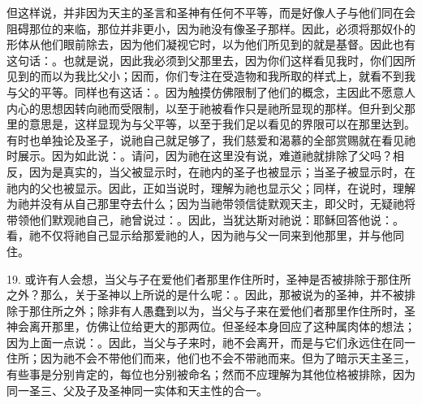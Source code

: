 但这样说，并非因为天主的圣言和圣神有任何不平等，而是好像人子与他们同在会阻碍那位的来临，那位并非更小，因为祂没有像圣子那样。因此，必须将那奴仆的形体从他们眼前除去，因为他们凝视它时，以为他们所见到的就是基督。因此也有这句话：。也就是说，因此我必须到父那里去，因为你们这样看见我时，你们因所见到的而以为我比父小；因而，你们专注在受造物和我所取的样式上，就看不到我与父的平等。同样也有这话：。因为触摸仿佛限制了他们的概念，主因此不愿意人内心的思想因转向祂而受限制，以至于祂被看作只是祂所显现的那样。但升到父那里的意思是，这样显现为与父平等，以至于我们足以看见的界限可以在那里达到。有时也单独论及圣子，说祂自己就足够了，我们慈爱和渴慕的全部赏赐就在看见祂时展示。因为如此说：。请问，因为祂在这里没有说，难道祂就排除了父吗？相反，因为是真实的，当父被显示时，在祂内的圣子也被显示；当圣子被显示时，在祂内的父也被显示。因此，正如当说时，理解为祂也显示父；同样，在说时，理解为祂并没有从自己那里夺去什么；因为当祂带领信徒默观天主，即父时，无疑祂将带领他们默观祂自己，祂曾说过：。因此，当犹达斯对祂说：耶稣回答他说：。看，祂不仅将祂自己显示给那爱祂的人，因为祂与父一同来到他那里，并与他同住。\par

19. 或许有人会想，当父与子在爱他们者那里作住所时，圣神是否被排除于那住所之外？那么，关于圣神以上所说的是什么呢：。因此，那被说为的圣神，并不被排除于那住所之外；除非有人愚蠢到以为，当父与子来在爱他们者那里作住所时，圣神会离开那里，仿佛让位给更大的那两位。但圣经本身回应了这种属肉体的想法；因为上面一点说：。因此，当父与子来时，祂不会离开，而是与它们永远住在同一住所；因为祂不会不带他们而来，他们也不会不带祂而来。但为了暗示天主圣三，有些事是分别肯定的，每位也分别被命名；然而不应理解为其他位格被排除，因为同一圣三、父及子及圣神同一实体和天主性的合一。\par


